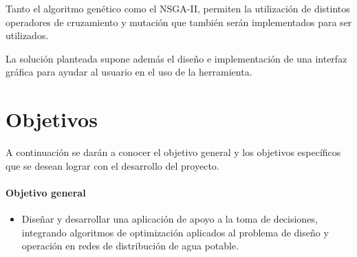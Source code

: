 \documentclass[11pt,letterpaper]{article}
\begin{document}
Tanto el algoritmo genético como el NSGA-II, permiten la utilización de distintos operadores de cruzamiento y mutación que también serán implementados para ser utilizados. 

La solución planteada supone además el diseño e implementación de una interfaz gráfica para ayudar al usuario en el uso de la herramienta.

\section{Objetivos}

A continuación se darán a conocer el objetivo general y los objetivos específicos que se desean lograr con el desarrollo del proyecto.

\paragraph{Objetivo general}

\begin{itemize}
\item Diseñar y desarrollar una aplicación de apoyo a la toma de decisiones, integrando algoritmos de optimización aplicados al problema de diseño y operación en redes de distribución de agua potable.
\end{itemize}
\end{document}
